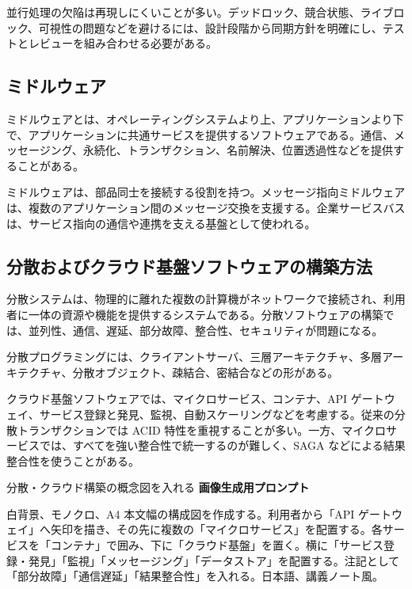 \documentclass[a4paper,11pt,ja=standard,xelatex]{bxjsarticle}
\begin{document}
並行処理の欠陥は再現しにくいことが多い。デッドロック、競合状態、ライブロック、可視性の問題などを避けるには、設計段階から同期方針を明確にし、テストとレビューを組み合わせる必要がある。

\subsection{ミドルウェア}

ミドルウェアとは、オペレーティングシステムより上、アプリケーションより下で、アプリケーションに共通サービスを提供するソフトウェアである。通信、メッセージング、永続化、トランザクション、名前解決、位置透過性などを提供することがある。

ミドルウェアは、部品同士を接続する役割を持つ。メッセージ指向ミドルウェアは、複数のアプリケーション間のメッセージ交換を支援する。企業サービスバスは、サービス指向の通信や連携を支える基盤として使われる。

\subsection{分散およびクラウド基盤ソフトウェアの構築方法}

分散システムは、物理的に離れた複数の計算機がネットワークで接続され、利用者に一体の資源や機能を提供するシステムである。分散ソフトウェアの構築では、並列性、通信、遅延、部分故障、整合性、セキュリティが問題になる。

分散プログラミングには、クライアントサーバ、三層アーキテクチャ、多層アーキテクチャ、分散オブジェクト、疎結合、密結合などの形がある。

クラウド基盤ソフトウェアでは、マイクロサービス、コンテナ、API ゲートウェイ、サービス登録と発見、監視、自動スケーリングなどを考慮する。従来の分散トランザクションでは ACID 特性を重視することが多い。一方、マイクロサービスでは、すべてを強い整合性で統一するのが難しく、SAGA などによる結果整合性を使うことがある。

\begin{todobox}{分散・クラウド構築の概念図を入れる}
\textbf{画像生成用プロンプト}

白背景、モノクロ、A4 本文幅の構成図を作成する。利用者から「API ゲートウェイ」へ矢印を描き、その先に複数の「マイクロサービス」を配置する。各サービスを「コンテナ」で囲み、下に「クラウド基盤」を置く。横に「サービス登録・発見」「監視」「メッセージング」「データストア」を配置する。注記として「部分故障」「通信遅延」「結果整合性」を入れる。日本語、講義ノート風。
\end{todobox}
\end{document}
